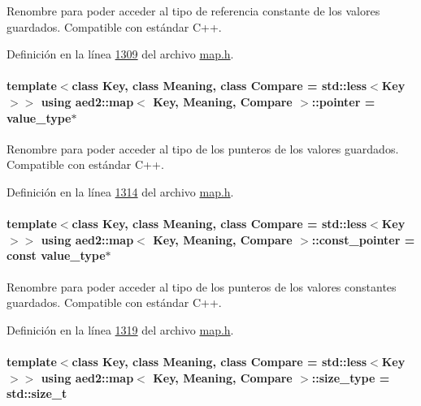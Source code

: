 Renombre para poder acceder al tipo de referencia constante de los valores guardados. Compatible con estándar C++. 



Definición en la línea \hyperlink{map_8h_source_l01309}{1309} del archivo \hyperlink{map_8h_source}{map.\-h}.

\hypertarget{classaed2_1_1map_a7394e98a23b86bc008ad73326b273fd5_a7394e98a23b86bc008ad73326b273fd5}{
\paragraph[{pointer}]{\setlength{\rightskip}{0pt plus 5cm}template$<$class Key, class Meaning, class Compare = std\-::less$<$\-Key$>$$>$ using {\bf aed2\-::map}$<$ Key, Meaning, Compare $>$\-::{\bf pointer} =  {\bf value\-\_\-type}$\ast$}}\label{classaed2_1_1map_a7394e98a23b86bc008ad73326b273fd5_a7394e98a23b86bc008ad73326b273fd5}


Renombre para poder acceder al tipo de los punteros de los valores guardados. Compatible con estándar C++. 



Definición en la línea \hyperlink{map_8h_source_l01314}{1314} del archivo \hyperlink{map_8h_source}{map.\-h}.

\hypertarget{classaed2_1_1map_a1366fc3e227a49777cb748fc6d4e022b_a1366fc3e227a49777cb748fc6d4e022b}{
\paragraph[{const\-\_\-pointer}]{\setlength{\rightskip}{0pt plus 5cm}template$<$class Key, class Meaning, class Compare = std\-::less$<$\-Key$>$$>$ using {\bf aed2\-::map}$<$ Key, Meaning, Compare $>$\-::{\bf const\-\_\-pointer} =  const {\bf value\-\_\-type}$\ast$}}\label{classaed2_1_1map_a1366fc3e227a49777cb748fc6d4e022b_a1366fc3e227a49777cb748fc6d4e022b}


Renombre para poder acceder al tipo de los punteros de los valores constantes guardados. Compatible con estándar C++. 



Definición en la línea \hyperlink{map_8h_source_l01319}{1319} del archivo \hyperlink{map_8h_source}{map.\-h}.

\hypertarget{classaed2_1_1map_a8cf1c570f605e9c0ad6feb8ce12c9400_a8cf1c570f605e9c0ad6feb8ce12c9400}{
\paragraph[{size\-\_\-type}]{\setlength{\rightskip}{0pt plus 5cm}template$<$class Key, class Meaning, class Compare = std\-::less$<$\-Key$>$$>$ using {\bf aed2\-::map}$<$ Key, Meaning, Compare $>$\-::{\bf size\-\_\-type} =  std\-::size\-\_\-t}}\label{classaed2_1_1map_a8cf1c570f605e9c0ad6feb8ce12c9400_a8cf1c570f605e9c0ad6feb8ce12c9400}


